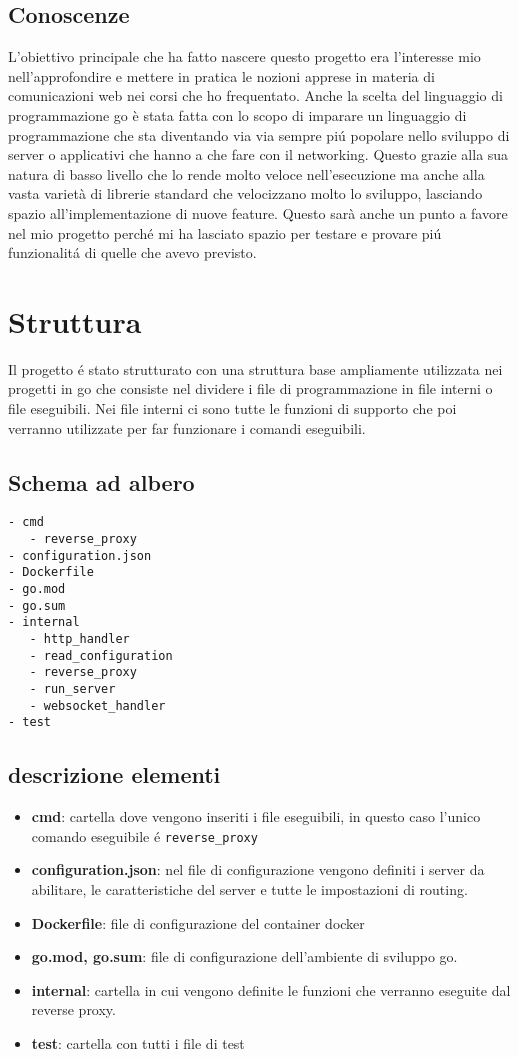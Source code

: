 \subsection{Conoscenze}
L'obiettivo principale che ha fatto nascere questo progetto era l'interesse mio nell'approfondire e mettere in pratica le nozioni apprese in materia di comunicazioni web nei corsi che ho frequentato. Anche la scelta del linguaggio di programmazione go è stata fatta con lo scopo di imparare un linguaggio di programmazione che sta diventando via via sempre piú popolare nello sviluppo di server o applicativi che hanno a che fare con il networking. Questo grazie alla sua natura di basso livello che lo rende molto veloce nell'esecuzione ma anche alla vasta varietà di librerie standard che velocizzano molto lo sviluppo, lasciando spazio all'implementazione di nuove feature. Questo sarà anche un punto a favore nel mio progetto perché mi ha lasciato spazio per testare e provare piú funzionalitá di quelle che avevo previsto.

\section{Struttura}
Il progetto é stato strutturato con una struttura base ampliamente utilizzata nei progetti in go che consiste nel dividere i file di programmazione in file interni o file eseguibili. Nei file interni ci sono tutte le funzioni di supporto che poi verranno utilizzate per far funzionare i comandi eseguibili.
\subsection{Schema ad albero}
\begin{verbatim}
- cmd
   - reverse_proxy
- configuration.json
- Dockerfile
- go.mod
- go.sum
- internal
   - http_handler
   - read_configuration
   - reverse_proxy
   - run_server
   - websocket_handler
- test
\end{verbatim}
\subsection{descrizione elementi}
\begin{itemize}[label={}]
  \item \textbf{cmd}: cartella dove vengono inseriti i file eseguibili, in questo caso l'unico comando eseguibile é \texttt{reverse\_proxy}
  \item \textbf{configuration.json}: nel file di configurazione vengono definiti i server da abilitare, le caratteristiche del server e tutte le impostazioni di routing.
  \item \textbf{Dockerfile}: file di configurazione del container docker
  \item \textbf{go.mod, go.sum}: file di configurazione dell'ambiente di sviluppo go.
  \item \textbf{internal}: cartella in cui vengono definite le funzioni che verranno eseguite dal reverse proxy.
  \item \textbf{test}: cartella con tutti i file di test
\end{itemize}

